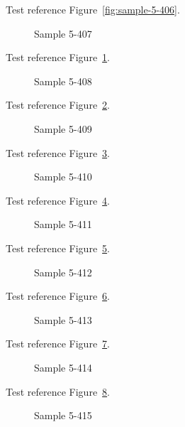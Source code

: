 Test reference Figure~\ref{fig:sample-5-406}.

\begin{figure}[tbhp]
\caption{Sample 5-407}
\label{fig:sample-5-407}
\end{figure}

Test reference Figure~\ref{fig:sample-5-407}.

\begin{figure}[tbhp]
\caption{Sample 5-408}
\label{fig:sample-5-408}
\end{figure}

Test reference Figure~\ref{fig:sample-5-408}.

\begin{figure}[tbhp]
\caption{Sample 5-409}
\label{fig:sample-5-409}
\end{figure}

Test reference Figure~\ref{fig:sample-5-409}.

\begin{figure}[tbhp]
\caption{Sample 5-410}
\label{fig:sample-5-410}
\end{figure}

Test reference Figure~\ref{fig:sample-5-410}.

\begin{figure}[tbhp]
\caption{Sample 5-411}
\label{fig:sample-5-411}
\end{figure}

Test reference Figure~\ref{fig:sample-5-411}.

\begin{figure}[tbhp]
\caption{Sample 5-412}
\label{fig:sample-5-412}
\end{figure}

Test reference Figure~\ref{fig:sample-5-412}.

\begin{figure}[tbhp]
\caption{Sample 5-413}
\label{fig:sample-5-413}
\end{figure}

Test reference Figure~\ref{fig:sample-5-413}.

\begin{figure}[tbhp]
\caption{Sample 5-414}
\label{fig:sample-5-414}
\end{figure}

Test reference Figure~\ref{fig:sample-5-414}.

\begin{figure}[tbhp]
\caption{Sample 5-415}
\label{fig:sample-5-415}
\end{figure}

